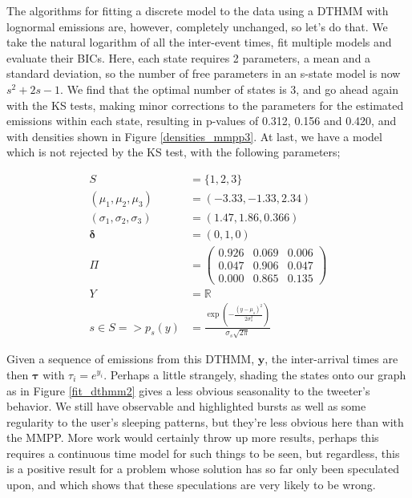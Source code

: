 The algorithms for fitting a discrete model to the data using a DTHMM with lognormal emissions are, however, completely unchanged, so let's do that. We take the natural logarithm of all the inter-event times, fit multiple models and evaluate their BICs. Here, each state requires 2 parameters, a mean and a standard deviation, so the number of free parameters in an s-state model is now $s^2+2s-1$. We find that the optimal number of states is 3, and go ahead again with the KS tests, making minor corrections to the parameters for the estimated emissions within each state, resulting in p-values of 0.312, 0.156 and 0.420, and with densities shown in Figure \ref{densities_mmpp3}. At last, we have a model which is not rejected by the KS test, with the following parameters;

\begin{align*}
S &= \{1,2,3\}\\
(\mu_1, \mu_2, \mu_3) &= (-3.33, -1.33, 2.34)\\
(\sigma_1, \sigma_2, \sigma_3) &= (1.47, 1.86, 0.366)\\
\bm{\delta} &= (0,1,0)\\
\Pi &= 
\left(
	\begin{matrix}
     0.926 & 0.069 & 0.006 \\
     0.047 & 0.906 & 0.047 \\
     0.000 & 0.865 & 0.135
	\end{matrix}
\right)\\
Y &= \mathbb{R}\\
s \in S => p_s(y) &= \frac{\exp({-\frac{(y-\mu_s)^2}{2\sigma_s^2}})}{\sigma_s\sqrt{2\pi}}
\end{align*}

Given a sequence of emissions from this DTHMM, $\mathbf{y}$, the inter-arrival times are then $\bm{\tau}$ with $\tau_i = e^{y_i}$. Perhaps a little strangely, shading the states onto our graph as in Figure \ref{fit_dthmm2} gives a less obvious seasonality to the tweeter's behavior. We still have observable and highlighted bursts as well as some regularity to the user's sleeping patterns, but they're less obvious here than with the MMPP. More work would certainly throw up more results, perhaps this requires a continuous time model for such things to be seen, but regardless, this is a positive result for a problem whose solution has so far only been speculated upon, and which shows that these speculations are very likely to be wrong.
\clearpage

